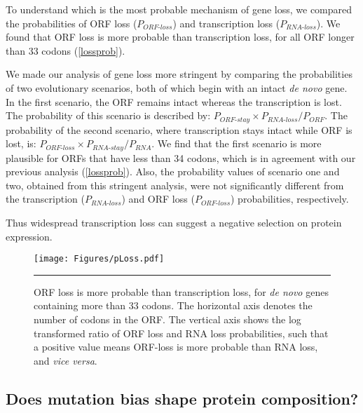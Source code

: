\documentclass[12pt,a4paper]{article}
\begin{document}
To understand which is the most probable mechanism of gene loss, we compared the probabilities of ORF loss ($P_\textit{ORF-loss}$) and transcription loss ($P_\textit{RNA-loss}$). We found that ORF loss is more probable than transcription loss, for all ORF longer than 33 codons (\autoref{lossprob}).

We made our analysis of gene loss more stringent by comparing the probabilities of two evolutionary scenarios, both of which begin with an intact \textit{de novo} gene. In the first scenario, the ORF remains intact whereas the transcription is lost. The probability of this scenario is described by: 
$P_\textit{ORF-stay} \times P_\textit{RNA-loss}/P_\textit{ORF}$. The probability of the second scenario, where transcription stays intact while ORF is lost, is: $P_\textit{ORF-loss} \times P_\textit{RNA-stay}/P_\textit{RNA}$. We find that the first scenario is more plausible for ORFs that have less than 34 codons, which is in agreement with our previous analysis (\autoref{lossprob}). Also, the probability values of scenario one and two, obtained from this stringent analysis, were not significantly different from the transcription ($P_\textit{RNA-loss}$) and ORF loss ($P_\textit{ORF-loss}$) probabilities, respectively. 

Thus widespread transcription loss can suggest a negative selection on protein expression.

\begin{figure}[!t]
\centering
\texttt{[image: Figures/pLoss.pdf]}
\caption{ORF loss is more probable than transcription loss, for \textit{de novo} genes containing more than 33 codons. The horizontal axis denotes the number of codons in the ORF. The vertical axis shows the log transformed ratio of ORF loss and RNA loss probabilities, such that a positive value means ORF-loss is more probable than RNA loss, and \textit{vice versa}.}
\label{lossprob}

\vspace{1ex}
\hrule
\end{figure}


\subsection{Does mutation bias shape protein composition?}
\end{document}
